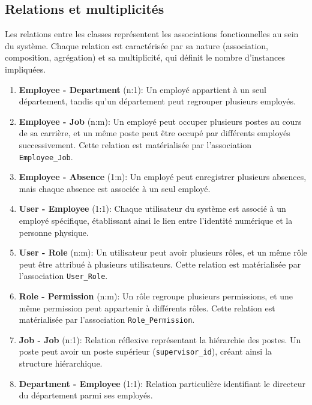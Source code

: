 \subsection{Relations et multiplicités}
Les relations entre les classes représentent les associations fonctionnelles au sein du système. Chaque relation est caractérisée par sa nature (association, composition, agrégation) et sa multiplicité, qui définit le nombre d'instances impliquées.

\begin{enumerate}
    \item \textbf{Employee - Department} (n:1): Un employé appartient à un seul département, tandis qu'un département peut regrouper plusieurs employés.
    
    \item \textbf{Employee - Job} (n:m): Un employé peut occuper plusieurs postes au cours de sa carrière, et un même poste peut être occupé par différents employés successivement. Cette relation est matérialisée par l'association \texttt{Employee\_Job}.
    
    \item \textbf{Employee - Absence} (1:n): Un employé peut enregistrer plusieurs absences, mais chaque absence est associée à un seul employé.
    
    \item \textbf{User - Employee} (1:1): Chaque utilisateur du système est associé à un employé spécifique, établissant ainsi le lien entre l'identité numérique et la personne physique.
    
    \item \textbf{User - Role} (n:m): Un utilisateur peut avoir plusieurs rôles, et un même rôle peut être attribué à plusieurs utilisateurs. Cette relation est matérialisée par l'association \texttt{User\_Role}.
    
    \item \textbf{Role - Permission} (n:m): Un rôle regroupe plusieurs permissions, et une même permission peut appartenir à différents rôles. Cette relation est matérialisée par l'association \texttt{Role\_Permission}.
    
    \item \textbf{Job - Job} (n:1): Relation réflexive représentant la hiérarchie des postes. Un poste peut avoir un poste supérieur (\texttt{supervisor\_id}), créant ainsi la structure hiérarchique.
    
    \item \textbf{Department - Employee} (1:1): Relation particulière identifiant le directeur du département parmi ses employés.
\end{enumerate}


